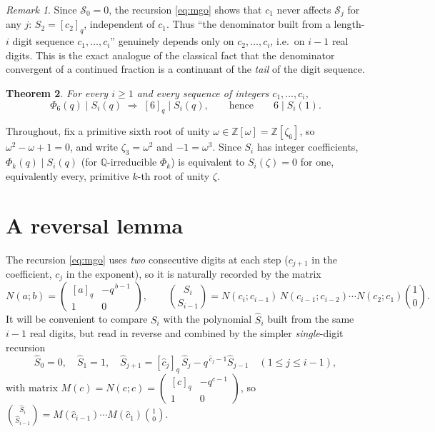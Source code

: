 \documentclass[11pt]{article}
\newtheorem{theorem}{Theorem}[section]
\theoremstyle{remark}
\newtheorem{remark}[theorem]{Remark}
\newcommand{\Z}{\mathbb{Z}}
\newcommand{\Q}{\mathbb{Q}}
\newcommand{\qint}[1]{[#1]_q}
\begin{document}
\begin{remark}\label{rem:c1}
Since $\mathcal S_0=0$, the recursion \eqref{eq:mgo} shows that $c_1$ never affects $\mathcal
S_j$ for any $j$: $S_2=\qint{c_2}$, independent of $c_1$. Thus ``the denominator built from a
length-$i$ digit sequence $c_1,\dots,c_i$'' genuinely depends only on $c_2,\dots,c_i$, i.e.\ on
$i-1$ real digits. This is the exact analogue of the classical fact that the denominator
convergent of a continued fraction is a continuant of the \emph{tail} of the digit sequence.
\end{remark}

\begin{theorem}\label{thm:main}
For every $i\ge1$ and every sequence of integers $c_1,\dots,c_i$,
\[
\Phi_6(q)\mid S_i(q) \;\Longrightarrow\; [6]_q\mid S_i(q), \qquad\text{hence}\qquad 6\mid S_i(1).
\]
\end{theorem}

Throughout, fix a primitive sixth root of unity $\omega\in\Z[\omega]=\Z[\zeta_6]$, so
$\omega^2-\omega+1=0$, and write $\zeta_3=\omega^2$ and $-1=\omega^3$. Since $S_i$ has integer
coefficients, $\Phi_k(q)\mid S_i(q)$ (for $\Q$-irreducible $\Phi_k$) is equivalent to
$S_i(\zeta)=0$ for one, equivalently every, primitive $k$-th root of unity $\zeta$.

\section{A reversal lemma}

The recursion \eqref{eq:mgo} uses \emph{two} consecutive digits at each step ($c_{j+1}$ in the
coefficient, $c_j$ in the exponent), so it is naturally recorded by the matrix
\[
N(a;b)=\begin{pmatrix}\qint a & -q^{\,b-1}\\ 1 & 0\end{pmatrix},\qquad
\binom{S_i}{S_{i-1}} = N(c_i;c_{i-1})\,N(c_{i-1};c_{i-2})\cdots N(c_2;c_1)\binom{1}{0}.
\]
It will be convenient to compare $S_i$ with the polynomial $\hat S_i$ built from the same $i-1$
real digits, but read in reverse and combined by the simpler \emph{single}-digit recursion
\begin{equation}\label{eq:hat}
\hat S_0=0,\quad \hat S_1=1,\quad \hat S_{j+1}=\qint{\hat c_j}\,\hat S_j-q^{\,\hat c_j-1}\hat
S_{j-1}\quad(1\le j\le i-1),
\end{equation}
with matrix $M(c)=N(c;c)=\left(\begin{smallmatrix}\qint c&-q^{c-1}\\1&0\end{smallmatrix}\right)$,
so $\binom{\hat S_i}{\hat S_{i-1}}=M(\hat c_{i-1})\cdots M(\hat c_1)\binom10$.
\end{document}
